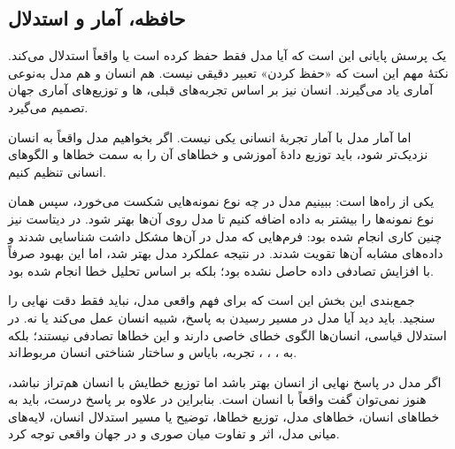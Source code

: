 \subsection{حافظه، آمار و استدلال}
یک پرسش پایانی این است که آیا مدل فقط حفظ کرده است یا واقعاً استدلال می‌کند. نکتهٔ مهم این است که «حفظ کردن» تعبیر دقیقی نیست. هم انسان و هم مدل به‌نوعی آماری یاد می‌گیرند. انسان نیز بر اساس تجربه‌های قبلی، ها و توزیع‌های آماری جهان تصمیم می‌گیرد.

اما آمار مدل با آمار تجربهٔ انسانی یکی نیست. اگر بخواهیم مدل واقعاً به انسان نزدیک‌تر شود، باید توزیع دادهٔ آموزشی و خطاهای آن را به سمت خطاها و الگوهای انسانی تنظیم کنیم.

یکی از راه‌ها  است: ببینیم مدل در چه نوع نمونه‌هایی شکست می‌خورد، سپس همان نوع نمونه‌ها را بیشتر به داده اضافه کنیم تا مدل روی آن‌ها بهتر شود. در دیتاست  نیز چنین کاری انجام شده بود: فرم‌هایی که مدل در آن‌ها مشکل داشت شناسایی شدند و داده‌های مشابه آن‌ها تقویت شدند. در نتیجه عملکرد مدل بهتر شد، اما این بهبود صرفاً با افزایش تصادفی داده حاصل نشده بود؛ بلکه بر اساس تحلیل خطا انجام شده بود.

جمع‌بندی این بخش این است که برای فهم واقعی مدل، نباید فقط دقت نهایی را سنجید. باید دید آیا مدل در مسیر رسیدن به پاسخ، شبیه انسان عمل می‌کند یا نه. در استدلال قیاسی، انسان‌ها الگوی خطای خاصی دارند و این خطاها تصادفی نیستند؛ بلکه به ، ، ، تجربه، بایاس و ساختار شناختی انسان مربوط‌اند.

اگر مدل در پاسخ نهایی از انسان بهتر باشد اما توزیع خطایش با انسان هم‌تراز نباشد، هنوز نمی‌توان گفت واقعاً با انسان  است. بنابراین در  علاوه بر پاسخ درست، باید به خطاهای انسان، خطاهای مدل، توزیع خطاها، توضیح یا مسیر استدلال انسان، لایه‌های میانی مدل، اثر  و تفاوت میان  صوری و  در جهان واقعی توجه کرد.
